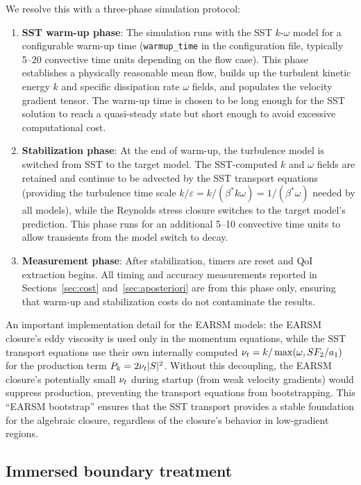 We resolve this with a three-phase simulation protocol:
\begin{enumerate}
    \item \textbf{SST warm-up phase}: The simulation runs with the SST $k$-$\omega$ model for a configurable warm-up time (\texttt{warmup\_time} in the configuration file, typically 5--20 convective time units depending on the flow case). This phase establishes a physically reasonable mean flow, builds up the turbulent kinetic energy $k$ and specific dissipation rate $\omega$ fields, and populates the velocity gradient tensor. The warm-up time is chosen to be long enough for the SST solution to reach a quasi-steady state but short enough to avoid excessive computational cost.

    \item \textbf{Stabilization phase}: At the end of warm-up, the turbulence model is switched from SST to the target model. The SST-computed $k$ and $\omega$ fields are retained and continue to be advected by the SST transport equations (providing the turbulence time scale $k/\varepsilon = k/(\beta^* k \omega) = 1/(\beta^* \omega)$ needed by all models), while the Reynolds stress closure switches to the target model's prediction. This phase runs for an additional 5--10 convective time units to allow transients from the model switch to decay.

    \item \textbf{Measurement phase}: After stabilization, timers are reset and QoI extraction begins. All timing and accuracy measurements reported in Sections~\ref{sec:cost} and~\ref{sec:aposteriori} are from this phase only, ensuring that warm-up and stabilization costs do not contaminate the results.
\end{enumerate}

An important implementation detail for the EARSM models: the EARSM closure's eddy viscosity is used only in the momentum equations, while the SST transport equations use their own internally computed $\nu_t = k / \max(\omega, S F_2 / a_1)$ for the production term $P_k = 2\nu_t |S|^2$.
Without this decoupling, the EARSM closure's potentially small $\nu_t$ during startup (from weak velocity gradients) would suppress production, preventing the transport equations from bootstrapping.
This ``EARSM bootstrap'' ensures that the SST transport provides a stable foundation for the algebraic closure, regardless of the closure's behavior in low-gradient regions.

\subsection{Immersed boundary treatment}
\label{sec:ibm_closures}

